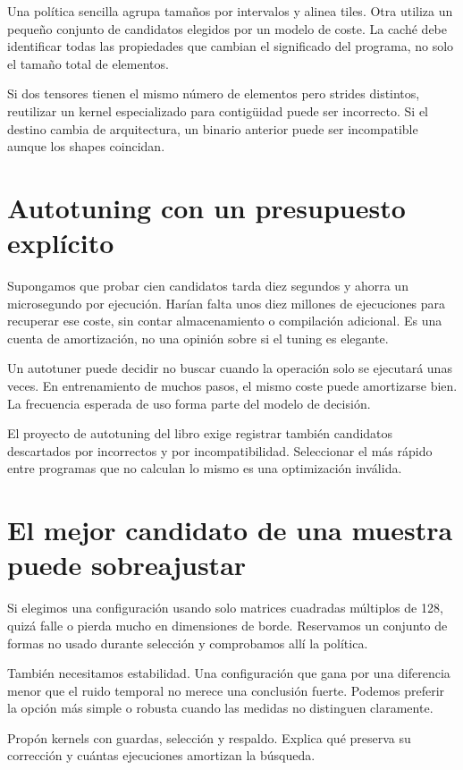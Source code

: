 \documentclass[12pt,a4paper,oneside]{report}
\begin{document}
Una política sencilla agrupa tamaños por intervalos y alinea tiles. Otra utiliza un pequeño conjunto de candidatos elegidos por un modelo de coste. La caché debe identificar todas las propiedades que cambian el significado del programa, no solo el tamaño total de elementos.

Si dos tensores tienen el mismo número de elementos pero strides distintos, reutilizar un kernel especializado para contigüidad puede ser incorrecto. Si el destino cambia de arquitectura, un binario anterior puede ser incompatible aunque los shapes coincidan.

\section{Autotuning con un presupuesto explícito}
Supongamos que probar cien candidatos tarda diez segundos y ahorra un microsegundo por ejecución. Harían falta unos diez millones de ejecuciones para recuperar ese coste, sin contar almacenamiento o compilación adicional. Es una cuenta de amortización, no una opinión sobre si el tuning es elegante.

Un autotuner puede decidir no buscar cuando la operación solo se ejecutará unas veces. En entrenamiento de muchos pasos, el mismo coste puede amortizarse bien. La frecuencia esperada de uso forma parte del modelo de decisión.

El proyecto de autotuning del libro exige registrar también candidatos descartados por incorrectos y por incompatibilidad. Seleccionar el más rápido entre programas que no calculan lo mismo es una optimización inválida.

\section{El mejor candidato de una muestra puede sobreajustar}
Si elegimos una configuración usando solo matrices cuadradas múltiplos de 128, quizá falle o pierda mucho en dimensiones de borde. Reservamos un conjunto de formas no usado durante selección y comprobamos allí la política.

También necesitamos estabilidad. Una configuración que gana por una diferencia menor que el ruido temporal no merece una conclusión fuerte. Podemos preferir la opción más simple o robusta cuando las medidas no distinguen claramente.

\begin{comprueba}
Propón kernels con guardas, selección y respaldo. Explica qué preserva su corrección y cuántas ejecuciones amortizan la búsqueda.

\end{comprueba}
\end{document}
